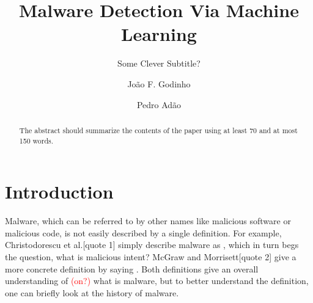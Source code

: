 \documentclass{llncs}
\begin{document}
\frontmatter

\title{Malware Detection Via Machine Learning}
\subtitle{Some Clever Subtitle?}
\author{João F. Godinho \and Pedro Adão}
\maketitle
{}



\begin{abstract}
The abstract should summarize the contents of the paper
using at least 70 and at most 150 words.
\end{abstract}



\clearpage
{}



\mainmatter
\section{Introduction}\label{sec:introduction}
Malware, which can be referred to by other names like malicious software or malicious code, is not easily described by a single definition. For example, Christodorescu et al.[quote 1] simply describe malware as , which in turn begs the question, what is malicious intent? McGraw and Morrisett[quote 2] give a more concrete definition by saying . Both definitions give an overall understanding of \textcolor{red}{(on?)} what is malware, but to better understand the definition, one can briefly look at the history of malware.
\end{document}
